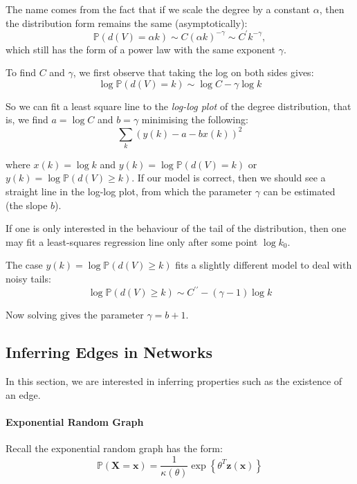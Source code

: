 \documentclass{article}
\begin{document}
\begin{remark}
    The name comes from the fact that if we scale the degree by a constant $\alpha$, then the distribution form remains the same (asymptotically):
    \[\mathbb{P}(d(V)=\alpha k)\sim C(\alpha k)^{-\gamma}\sim C^{\prime}k^{-\gamma},\]
    which still has the form of a power law with the same exponent $\gamma$.
\end{remark}

To find $C$ and $\gamma$, we first observe that taking the log on both sides gives:
\begin{equation*}
    \log \mathbb{P}(d(V)=k)\sim \log C - \gamma \log k
\end{equation*}

So we can fit a least square line to the \textit{log-log plot} of the degree distribution, that is, we find  $a=\log C$ and $b=\gamma$ minimising the following:
\begin{equation}\label{eq:least_squares_power_law}
    \sum_k (y(k)-a-b x(k))^{2}
\end{equation}

where $x(k)=\log k$ and $y(k)=\log \mathbb{P}(d(V)=k)$ or $y(k)=\log \mathbb{P}(d(V)\geq k)$. If our model is correct, then we should see a straight line in the log-log plot, from which the parameter $\gamma$ can be estimated (the slope $b$).

\begin{remark}
    If one is only interested in the behaviour of the tail of the distribution, then one may fit a least-squares regression line only after some point $\log k_0$.
\end{remark}

The case $y(k) = \log \mathbb{P}(d(V)\geq k)$ fits a slightly different model to deal with noisy tails:
\begin{equation*}
    \log\mathbb{P}(d(V)\geq k)\sim C^{\prime\prime}-(\gamma-1)\log k
\end{equation*}

Now solving  gives the parameter $\gamma=b+1$.

\subsection{Inferring Edges in Networks}

In this section, we are interested in inferring properties such as the existence of an edge.
\paragraph{Exponential Random Graph}
Recall the exponential random graph has the form:
\begin{equation*}
    \mathbb{P}(\mathbf{X}=\mathbf{x})={\frac{1}{\kappa(\theta)}}\exp\left\{\theta^{T}\mathbf{z}(\mathbf{x})\right\}
\end{equation*}
\end{document}
